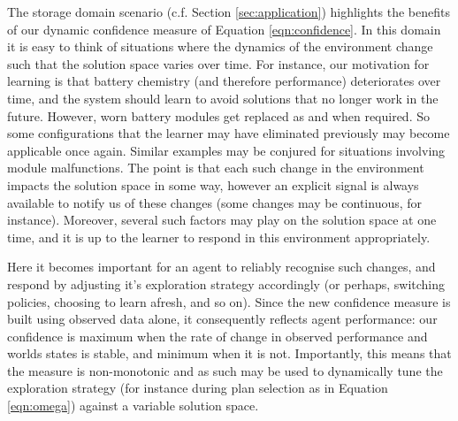The storage domain scenario (c.f. Section \ref{sec:application}) highlights the benefits of our dynamic confidence measure of Equation \ref{eqn:confidence}. In this domain it is easy to think of situations where the dynamics of the environment change such that the solution space varies over time. For instance, our motivation for learning is that battery chemistry (and therefore performance) deteriorates over time, and the system should learn to avoid solutions that no longer work in the future. However, worn battery modules get replaced as and when required. So some configurations that the learner may have eliminated previously may become applicable once again. Similar examples may be conjured for situations involving module malfunctions. The point is that each such change in the environment impacts the solution space in some way, however an explicit signal is always available to notify us of these changes (some changes may be continuous, for instance). Moreover, several such factors may play on the solution space at one time, and it is up to the learner to respond in this environment appropriately.

Here it becomes important for an agent to reliably recognise such changes, and respond by adjusting it's exploration strategy accordingly (or perhaps, switching policies, choosing to learn afresh, and so on). Since the new confidence measure is built using observed data alone, it consequently reflects agent performance: our confidence is maximum when the rate of change in observed performance and worlds states is stable, and minimum when it is not. Importantly, this means that the measure is non-monotonic and as such may be used to dynamically tune the exploration strategy (for instance during plan selection as in Equation \ref{eqn:omega}) against a variable solution space.
